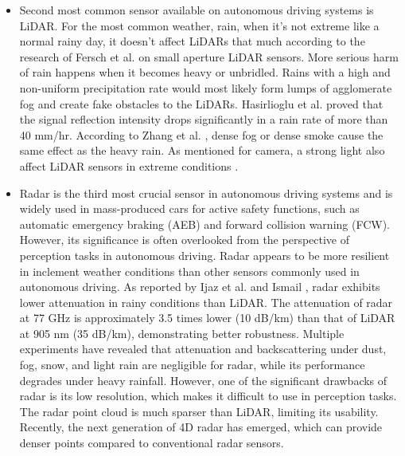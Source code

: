 \documentclass[rnd]{mas_proposal}
\begin{document}
\begin{itemize}
    \item Second most common sensor available on autonomous driving systems is LiDAR. For the most common weather, rain, when it’s not extreme like a normal rainy day, it doesn’t affect LiDARs that much according to the research of Fersch et al. \cite{fersch2016influence} on small aperture LiDAR sensors. More serious harm of rain happens when it becomes heavy or unbridled. Rains with a high and non-uniform precipitation rate would most likely form lumps of agglomerate fog and create fake obstacles to the LiDARs. Hasirlioglu et al. \cite{hasirlioglu2016modeling} proved that the signal reflection intensity drops significantly in a rain rate of more than 40 mm/hr. According to Zhang et al. \cite{Zhang2021Dec}, dense fog or dense smoke cause the same effect as the heavy rain. As mentioned for camera, a strong light also affect LiDAR sensors in extreme conditions \cite{acarballo2020libre}.
    

    \item Radar is the third most crucial sensor in autonomous driving systems and is widely used in mass-produced cars for active safety functions, such as automatic emergency braking (AEB) and forward collision warning (FCW). However, its significance is often overlooked from the perspective of perception tasks in autonomous driving. Radar appears to be more resilient in inclement weather conditions than other sensors commonly used in autonomous driving. As reported by Ijaz et al. \cite{ijaz2012analysis} and Ismail \cite{gultepe2008measurements}, radar exhibits lower attenuation in rainy conditions than LiDAR. The attenuation of radar at 77 GHz is approximately 3.5 times lower (10 dB/km) than that of LiDAR at 905 nm (35 dB/km), demonstrating better robustness. Multiple experiments \cite{adams2012robotic, brooker2007seeing, xu2022learned, gourova2017analysis, zang2019impact} have revealed that attenuation and backscattering under dust, fog, snow, and light rain are negligible for radar, while its performance degrades under heavy rainfall. However, one of the significant drawbacks of radar is its low resolution, which makes it difficult to use in perception tasks. The radar point cloud is much sparser than LiDAR, limiting its usability. Recently, the next generation of 4D radar has emerged, which can provide denser points compared to conventional radar sensors.


\end{itemize}
\end{document}
